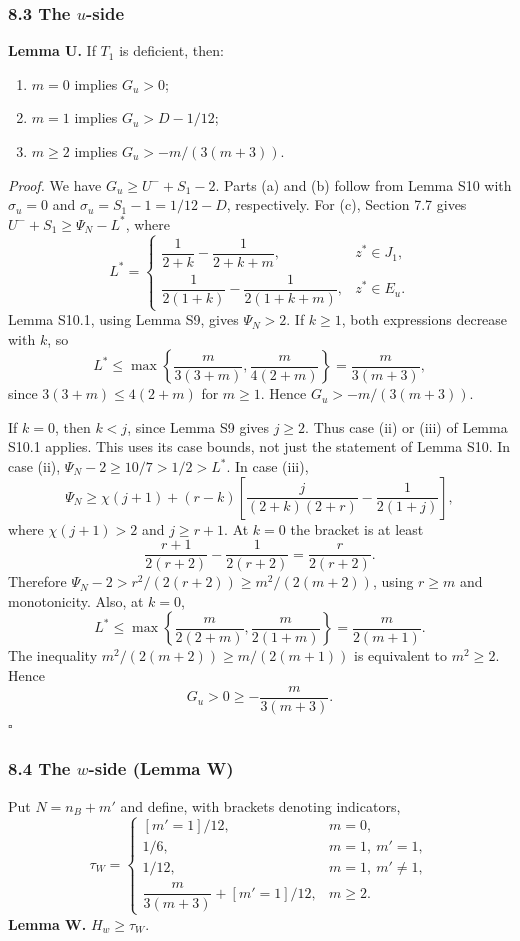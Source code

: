 \subsubsection*{8.3 The $u$-side}
\textbf{Lemma U.} If $T_1$ is deficient, then:
\begin{enumerate}
\item[(a)] $m=0$ implies $G_u>0$;
\item[(b)] $m=1$ implies $G_u>D-1/12$;
\item[(c)] $m\ge2$ implies $G_u>-m/(3(m+3))$.
\end{enumerate}
\emph{Proof.} We have $G_u\ge U^-+S_1-2$. Parts (a) and (b) follow from Lemma S10 with $\sigma_u=0$ and $\sigma_u=S_1-1=1/12-D$, respectively.
For (c), Section 7.7 gives $U^-+S_1\ge\Psi_N-L^*$, where
\[
 L^*=\begin{cases}
 \dfrac1{2+k}-\dfrac1{2+k+m},&z^*\in J_1,\\[4pt]
 \dfrac1{2(1+k)}-\dfrac1{2(1+k+m)},&z^*\in E_u.
 \end{cases}
\]
Lemma S10.1, using Lemma S9, gives $\Psi_N>2$.
If $k\ge1$, both expressions decrease with $k$, so
\[
 L^*\le\max\left\{\frac{m}{3(3+m)},\frac{m}{4(2+m)}\right\}
 =\frac{m}{3(m+3)},
\]
since $3(3+m)\le4(2+m)$ for $m\ge1$. Hence $G_u>-m/(3(m+3))$.

If $k=0$, then $k<j$, since Lemma S9 gives $j\ge2$. Thus case (ii) or (iii) of Lemma S10.1 applies. This uses its case bounds, not just the statement of Lemma S10. In case (ii), $\Psi_N-2\ge10/7>1/2>L^*$. In case (iii),
\[
 \Psi_N\ge\chi(j+1)+(r-k)
 \left[\frac{j}{(2+k)(2+r)}-\frac1{2(1+j)}\right],
\]
where $\chi(j+1)>2$ and $j\ge r+1$. At $k=0$ the bracket is at least
\[
 \frac{r+1}{2(r+2)}-\frac1{2(r+2)}=\frac r{2(r+2)}.
\]
Therefore $\Psi_N-2>r^2/(2(r+2))\ge m^2/(2(m+2))$, using $r\ge m$ and monotonicity. Also, at $k=0$,
\[
 L^*\le\max\left\{\frac m{2(2+m)},\frac m{2(1+m)}\right\}
 =\frac m{2(m+1)}.
\]
The inequality $m^2/(2(m+2))\ge m/(2(m+1))$ is equivalent to $m^2\ge2$. Hence
\[
 G_u>0\ge-\frac{m}{3(m+3)}.
\]
\hfill$\square$

\subsubsection*{8.4 The $w$-side (Lemma W)}
Put $N=n_B+m'$ and define, with brackets denoting indicators,
\[
 \tau_W=\begin{cases}
 [m'=1]/12,&m=0,\\
 1/6,&m=1,\ m'=1,\\
 1/12,&m=1,\ m'\ne1,\\
 \dfrac{m}{3(m+3)}+[m'=1]/12,&m\ge2.
 \end{cases}
\]
\textbf{Lemma W.} $H_w\ge\tau_W$.

